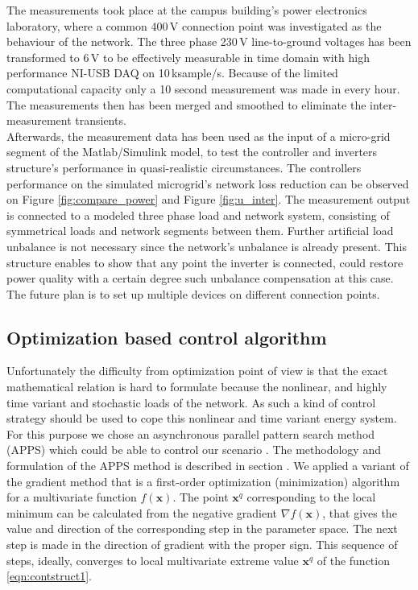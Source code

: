             The measurements took place at the campus building's power electronics laboratory, where a common 400\,V connection point was investigated as the behaviour of the network. The three phase 230\,V line-to-ground voltages has been transformed to 6\,V to be effectively measurable in time domain with high performance NI-USB DAQ on 10\,ksample/s. Because of the limited computational capacity only a 10 second measurement was made in every hour.  The measurements then has been merged and smoothed to eliminate the inter-measurement transients.\\
            Afterwards, the measurement data has been used as the input of a micro-grid segment of the Matlab/Simulink model, to test the controller and inverters structure's performance in quasi-realistic circumstances. The controllers performance on the simulated microgrid's network loss reduction can be observed on Figure \ref{fig:compare_power} and Figure \ref{fig:u_inter}. The measurement output is connected to a modeled three phase load and network system, consisting of symmetrical loads and network segments between them. Further artificial load unbalance is not necessary since the network's unbalance is already present. This structure enables to show that any point the inverter is connected, could restore power quality with a certain degree such unbalance compensation at this case. The future plan is to set up multiple devices on different connection points.

    \subsection{Optimization based control algorithm}\label{VUB:sec:Optimization}

        Unfortunately the difficulty from optimization point of view is that the exact mathematical relation is hard to formulate because the nonlinear, and highly time variant and stochastic loads of the network. As such a kind of control strategy should be used to cope this nonlinear and time variant energy system. For this purpose we chose an asynchronous parallel pattern search method (APPS) which could be able to control our scenario \cite{hough2001asynchronous}. The methodology and formulation of the APPS method is described in section . We applied a variant of the gradient method that is a first-order optimization (minimization) algorithm for a multivariate function $f(\textbf{x})$. The point $\textbf{x}^q$ corresponding to the local minimum can be calculated from the negative gradient $\nabla f(\textbf{x})$, that gives the value and direction of the corresponding step in the parameter space. The next step is made in the direction of gradient with the proper sign. This sequence of steps, ideally, converges to local multivariate extreme value $\textbf{x}^q$ of the function \ref{eqn:contstruct1}.

